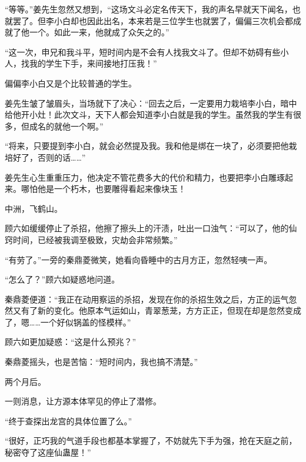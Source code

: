 \begin{this_body}
“等等。”姜先生忽然又想到，“这场文斗必定名传天下，我的声名早就天下闻名，也就罢了。但李小白却也因此出名，本来若是三位学生也就罢了，偏偏三次机会都成就了他一个。如此一来，他就成了众矢之的。”

“这一次，申兄和我斗平，短时间内是不会有人找我文斗了。但却不妨碍有些小人，找我的学生下手，来间接地打压我！”

偏偏李小白又是个比较普通的学生。

姜先生皱了皱眉头，当场就下了决心：“回去之后，一定要用力栽培李小白，暗中给他开小灶！此次文斗，天下人都会知道李小白就是我的学生。虽然我的学生有很多，但成名的就他一个啊。”

“将来，只要提到李小白，就会必然提及我。我和他是绑在一块了，必须要把他栽培好了，否则的话……”

姜先生心生重重压力，他决定不管花费多大的代价和精力，也要把李小白雕琢起来。哪怕他是一个朽木，也要雕得看起来像块玉！

中洲，飞鹤山。

顾六如缓缓停止了杀招，他擦了擦头上的汗渍，吐出一口浊气：“可以了，他的仙窍时间，已经被我调至极致，灾劫会非常频繁。”

“有劳了。”一旁的秦鼎菱微笑，她看向昏睡中的古月方正，忽然轻咦一声。

“怎么了？”顾六如疑惑地问道。

秦鼎菱便道：“我正在动用察运的杀招，发现在你的杀招生效之后，方正的运气忽然又有了新的变化。他原本气运如山，青翠葱茏，方方正正，但现在却是忽然变成了，嗯……一个好似锅盖的怪模样。”

顾六如更加疑惑：“这是什么预兆？”

秦鼎菱摇头，也是苦恼：“短时间内，我也搞不清楚。”

两个月后。

一则消息，让方源本体罕见的停止了潜修。

“终于查探出龙宫的具体位置了么。”

“很好，正巧我的气道手段也都基本掌握了，不妨就先下手为强，抢在天庭之前，秘密夺了这座仙蛊屋！”

\end{this_body}

